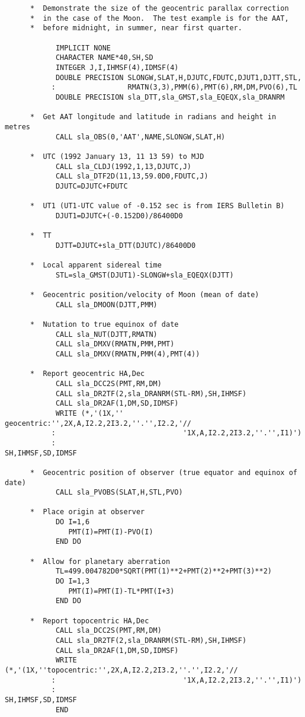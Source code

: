\documentclass[11pt,twoside]{article}
\begin{document}
\begin{verbatim}
      *  Demonstrate the size of the geocentric parallax correction
      *  in the case of the Moon.  The test example is for the AAT,
      *  before midnight, in summer, near first quarter.

            IMPLICIT NONE
            CHARACTER NAME*40,SH,SD
            INTEGER J,I,IHMSF(4),IDMSF(4)
            DOUBLE PRECISION SLONGW,SLAT,H,DJUTC,FDUTC,DJUT1,DJTT,STL,
           :                 RMATN(3,3),PMM(6),PMT(6),RM,DM,PVO(6),TL
            DOUBLE PRECISION sla_DTT,sla_GMST,sla_EQEQX,sla_DRANRM

      *  Get AAT longitude and latitude in radians and height in metres
            CALL sla_OBS(0,'AAT',NAME,SLONGW,SLAT,H)

      *  UTC (1992 January 13, 11 13 59) to MJD
            CALL sla_CLDJ(1992,1,13,DJUTC,J)
            CALL sla_DTF2D(11,13,59.0D0,FDUTC,J)
            DJUTC=DJUTC+FDUTC

      *  UT1 (UT1-UTC value of -0.152 sec is from IERS Bulletin B)
            DJUT1=DJUTC+(-0.152D0)/86400D0

      *  TT
            DJTT=DJUTC+sla_DTT(DJUTC)/86400D0

      *  Local apparent sidereal time
            STL=sla_GMST(DJUT1)-SLONGW+sla_EQEQX(DJTT)

      *  Geocentric position/velocity of Moon (mean of date)
            CALL sla_DMOON(DJTT,PMM)

      *  Nutation to true equinox of date
            CALL sla_NUT(DJTT,RMATN)
            CALL sla_DMXV(RMATN,PMM,PMT)
            CALL sla_DMXV(RMATN,PMM(4),PMT(4))

      *  Report geocentric HA,Dec
            CALL sla_DCC2S(PMT,RM,DM)
            CALL sla_DR2TF(2,sla_DRANRM(STL-RM),SH,IHMSF)
            CALL sla_DR2AF(1,DM,SD,IDMSF)
            WRITE (*,'(1X,'' geocentric:'',2X,A,I2.2,2I3.2,''.'',I2.2,'//
           :                              '1X,A,I2.2,2I3.2,''.'',I1)')
           :                                                SH,IHMSF,SD,IDMSF

      *  Geocentric position of observer (true equator and equinox of date)
            CALL sla_PVOBS(SLAT,H,STL,PVO)

      *  Place origin at observer
            DO I=1,6
               PMT(I)=PMT(I)-PVO(I)
            END DO

      *  Allow for planetary aberration
            TL=499.004782D0*SQRT(PMT(1)**2+PMT(2)**2+PMT(3)**2)
            DO I=1,3
               PMT(I)=PMT(I)-TL*PMT(I+3)
            END DO

      *  Report topocentric HA,Dec
            CALL sla_DCC2S(PMT,RM,DM)
            CALL sla_DR2TF(2,sla_DRANRM(STL-RM),SH,IHMSF)
            CALL sla_DR2AF(1,DM,SD,IDMSF)
            WRITE (*,'(1X,''topocentric:'',2X,A,I2.2,2I3.2,''.'',I2.2,'//
           :                              '1X,A,I2.2,2I3.2,''.'',I1)')
           :                                                SH,IHMSF,SD,IDMSF
            END
\end{verbatim}
\end{document}
